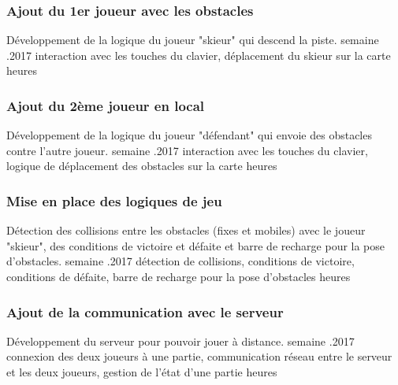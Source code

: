 \documentclass[a4paper,11pt]{article}
\begin{document}
	\subsubsection{Ajout du 1er joueur avec les obstacles}
	\begin{enumerate}[labelwidth=5em,leftmargin=8em]
		\objectif Développement de la logique du joueur "skieur" qui descend la piste.
		 semaine
		.2017
		\partageTache interaction avec les touches du clavier, déplacement du skieur sur la carte
		 heures
	\end{enumerate}

	\subsubsection{Ajout du 2ème joueur en local}
	\begin{enumerate}[labelwidth=5em,leftmargin=8em]
		\objectif Développement de la logique du joueur "défendant" qui envoie des obstacles contre l'autre joueur.
		 semaine
		.2017
		\partageTache interaction avec les touches du clavier, logique de déplacement des obstacles sur la carte
		 heures
	\end{enumerate}

	\subsubsection{Mise en place des logiques de jeu}
	\begin{enumerate}[labelwidth=5em,leftmargin=8em]
		\objectif Détection des collisions entre les obstacles (fixes et mobiles) avec le joueur "skieur", des conditions de victoire et défaite et barre de recharge pour la pose d'obstacles.
		 semaine
		.2017
		\partageTache détection de collisions, conditions de victoire, conditions de défaite, barre de recharge pour la pose d'obstacles
		 heures
	\end{enumerate}

	\subsubsection{Ajout de la communication avec le serveur}
	\begin{enumerate}[labelwidth=5em,leftmargin=8em]
		\objectif Développement du serveur pour pouvoir jouer à distance.
		 semaine
		.2017
		\partageTache connexion des deux joueurs à une partie, communication réseau entre le serveur et les deux joueurs, gestion de l'état d'une partie
		 heures
	\end{enumerate}
\end{document}
